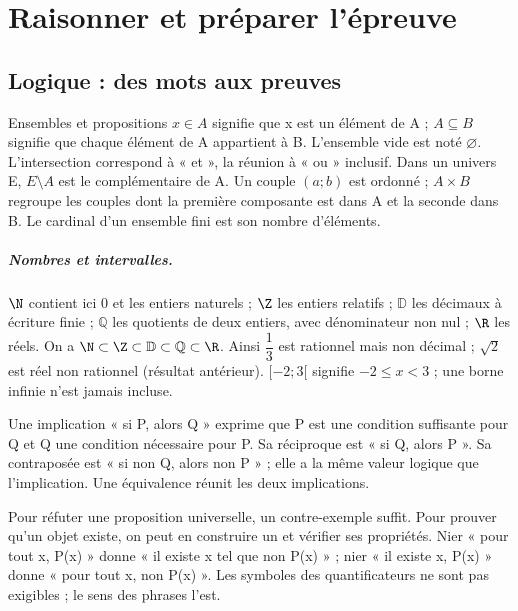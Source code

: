\chapter{Raisonner et préparer l’épreuve}\label{TRANS}
\section{Logique : des mots aux preuves}\label{LOGIQUE}
\begin{repere}{Ensembles et propositions}
$x\in A$ signifie que x est un élément de A ; $A\subseteq B$ signifie que chaque élément de A appartient à B. L’ensemble vide est noté $\varnothing$. L’intersection correspond à « et », la réunion à « ou » inclusif. Dans un univers E, $E\setminus A$ est le complémentaire de A. Un couple $(a;b)$ est ordonné ; $A\times B$ regroupe les couples dont la première composante est dans A et la seconde dans B. Le cardinal d’un ensemble fini est son nombre d’éléments.
\end{repere}

\paragraph{Nombres et intervalles.} $\N$ contient ici 0 et les entiers naturels ; $\Z$ les entiers relatifs ; $\mathbb D$ les décimaux à écriture finie ; $\mathbb Q$ les quotients de deux entiers, avec dénominateur non nul ; $\R$ les réels. On a $\N\subset\Z\subset\mathbb D\subset\mathbb Q\subset\R$. Ainsi $\dfrac{1}{3}$ est rationnel mais non décimal ; $\sqrt2$ est réel non rationnel (résultat antérieur). $[-2;3[$ signifie $-2\leq x<3$ ; une borne infinie n’est jamais incluse.

Une implication « si P, alors Q » exprime que P est une condition suffisante pour Q et Q une condition nécessaire pour P. Sa réciproque est « si Q, alors P ». Sa contraposée est « si non Q, alors non P » ; elle a la même valeur logique que l’implication. Une équivalence réunit les deux implications.

Pour réfuter une proposition universelle, un contre-exemple suffit. Pour prouver qu’un objet existe, on peut en construire un et vérifier ses propriétés. Nier « pour tout x, P(x) » donne « il existe x tel que non P(x) » ; nier « il existe x, P(x) » donne « pour tout x, non P(x) ». Les symboles des quantificateurs ne sont pas exigibles ; le sens des phrases l’est.

